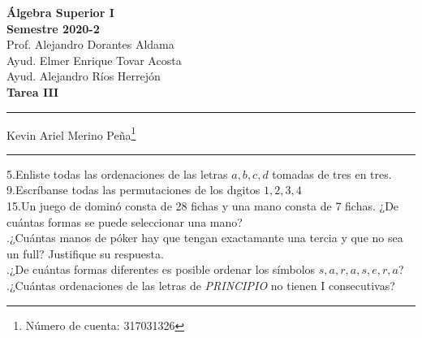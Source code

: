 \documentclass[letterpaper]{article}
\renewcommand{\*}{\cdot}
\theoremstyle{definition}
\begin{document}
\begin{center}
	\vspace{-114pt}
	\textbf{\large Álgebra Superior I}\\
	\textbf{ Semestre 2020-2}\\
	Prof. Alejandro Dorantes Aldama\\
	Ayud. Elmer Enrique Tovar Acosta \\
	Ayud. Alejandro Ríos Herrejón \\
	\textbf{Tarea III}
\rule{19cm}{0.2mm}
	\begin{center}
Kevin Ariel Merino Peña\footnote[2]{Número de cuenta: 317031326}
	\end{center}
\rule{19cm}{0.2mm}
\end{center}
\noindent5.Enliste todas las ordenaciones de las letras $ a, b, c, d $ tomadas de tres en tres.\\

\noindent9.Escríbanse todas las permutaciones de los dıgitos $ 1, 2, 3, 4 $\\


\noindent15.Un juego de dominó consta de 28 fichas y una mano consta de 7 fichas.
¿De cuántas formas se puede seleccionar una mano?\\


.¿Cuántas manos de póker hay que tengan exactamante una tercia y que no sea un full? Justifique su respuesta.\\


.¿De cuántas formas diferentes es posible ordenar los símbolos $ s,a,r,a,s,e,r,a $?\\


.¿Cuántas ordenaciones de las letras de \textit{PRINCIPIO} no tienen I consecutivas?
\end{document}
